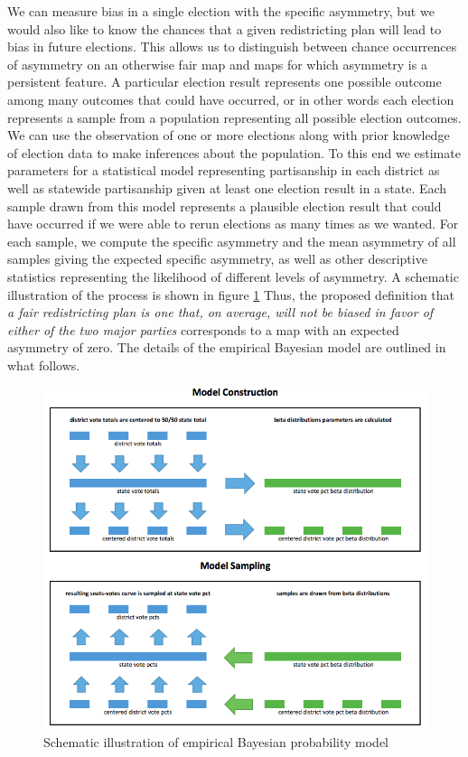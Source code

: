 \documentclass[preprint,12pt]{article}
\begin{document}
We can measure bias in a single election with the specific asymmetry, but we would also like to know the chances that a given redistricting plan will lead to bias in future elections.
This allows us to distinguish between chance occurrences of asymmetry on an otherwise fair map and maps for which asymmetry is a persistent feature.
A particular election result represents one possible outcome among many outcomes that could have occurred, or in other words each election represents a sample from a population representing all possible election outcomes.
We can use the observation of one or more elections along with prior knowledge of election data to make inferences about the population.
To this end we estimate parameters for a statistical model representing partisanship in each district as well as statewide partisanship given at least one election result in a state.
Each sample drawn from this model represents a plausible election result that could have occurred if we were able to rerun elections as many times as we wanted.
For each sample, we compute the specific asymmetry and the mean asymmetry of all samples giving the expected specific asymmetry, as well as other descriptive statistics representing the likelihood of different levels of asymmetry.
A schematic illustration of the process is shown in figure \ref{fig:ProbModel}
Thus, the proposed definition that \emph{a fair redistricting plan is one that, on average, will not be biased in favor of either of the two major parties} corresponds to a map with an expected asymmetry of zero.
The details of the empirical Bayesian model are outlined in what follows.

\begin{figure}[htb!]
    \begin{center}
        \includegraphics[scale=0.6]{../Figures/Other/probability_model.png}
        \caption{Schematic illustration of empirical Bayesian probability model}\label{fig:ProbModel}
    \end{center}
\end{figure}
\end{document}
